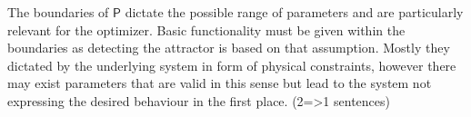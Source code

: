 

    The boundaries of $\mathsf{P}$ dictate the possible range of parameters and are particularly relevant for the optimizer. Basic functionality must be given within the boundaries as detecting the attractor is based on that assumption. Mostly they dictated by the underlying system in form of physical constraints, however there may exist parameters that are valid in this sense but lead to the system not expressing the desired behaviour in the first place.  (2=>1 sentences)









    
    








